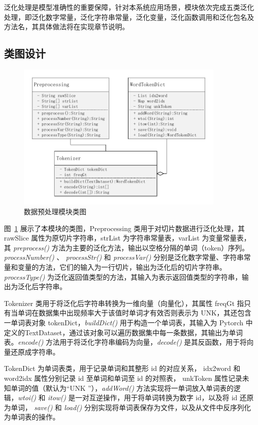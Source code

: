 泛化处理是模型准确性的重要保障，针对本系统应用场景，模块依次完成五类泛化处理，即泛化数字常量，泛化字符串常量，泛化变量，泛化函数调用和泛化包名及方法名，其具体做法将在实现章节说明。

\subsection{类图设计}

\begin{figure}[!htb]
    \centering
    \includegraphics[width=0.9\textwidth]{FIGs/chapter3/preClass.pdf}
    \caption{数据预处理模块类图}\label{preClass}
\end{figure}

图~\ref{preClass} 展示了本模块的类图，Preprocessing 类用于对切片数据进行泛化处理，其 rawSlice 属性为原切片字符串，strList 为字符串常量表，varList 为变量常量表，其 \textit{preprocess()} 方法为主要的泛化方法，输出以空格分隔的单词（token）序列。\textit{processNumber()} 、 \textit{processStr()} 和 \textit{processVar()} 分别是泛化数字常量、字符串常量和变量的方法，它们的输入为一行切片，输出为泛化后的切片字符串。\textit{processType()} 为泛化返回值类型的方法，其输入为表示返回值类型的字符串，输出为泛化后字符串。

Tokenizer 类用于将泛化后字符串转换为一维向量（向量化），其属性 freqGt 指只有当单词在数据集中出现频率大于该值时单词才有效否则表示为 UNK，其还包含一单词表对象 tokenDict，\textit{buildDict()} 用于构造一个单词表，其输入为 Pytorch 中定义的TextDataset，通过该对象可以遍历数据集中每一条数据，其输出为单词表。\textit{encode()} 方法用于将泛化字符串编码为向量，\textit{decode()} 是其反函数，用于将向量还原成字符串。

TokenDict 为单词表类，用于记录单词和其整形 id 的对应关系， idx2word 和word2idx 属性分别记录 id 至单词和单词至 id 的对照表， unkToken 属性记录未知单词的值（默认为“UNK ”），\textit{addWord()} 方法实现将一单词放入单词表的逻辑，\textit{wtoi()} 和 \textit{itow()} 是一对互逆操作，用于将单词转换为数字 id，以及将 id 还原为单词， \textit{save()} 和 \textit{load()} 分别实现将单词表保存为文件，以及从文件中反序列化为单词表的操作。

